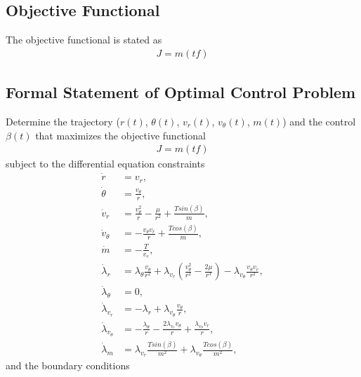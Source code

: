 \documentclass[]{article}
\begin{document}
\subsection{Objective Functional}
The objective functional is stated as
\begin{align}
	J = m(tf)
\end{align}
\subsection{Formal Statement of Optimal Control Problem}
Determine the trajectory (\(r(t)\), \(\theta(t)\), \(v_r(t)\), \(v_\theta(t)\), \(m(t)\)) and the control \(\beta(t)\) that maximizes the objective functional
\begin{align*}
	J = m(tf)
\end{align*}
subject to the differential equation constraints
\begin{align*}
	\dot{r}        &= v_r, \\
	\dot{\theta}   &= \frac{v_\theta}{r}, \\
	\dot{v}_r      &= \frac{v^2_{\theta}}{r} - \frac{\mu}{r^2} + \frac{Tsin(\beta)}{m}, \\
    \dot{v}_\theta &= -\frac{v_{\theta}v_{r}}{r}   + \frac{Tcos(\beta)}{m}, \\
	\dot{m}        &= -\frac{T}{v_e}, \\
	\dot{\lambda}_r      &=\lambda_\theta\frac{v_\theta}{r^2} + \lambda_{v_r}(\frac{v_{\theta}^2}{r^2} - \frac{2\mu}{r^3}) - \lambda_{v_\theta}\frac{v_{\theta}v_r}{r^2},\\
    \dot{\lambda}_\theta &= 0,                                                                                                    \\
    \dot{\lambda}_{v_r}  &= -\lambda_r + \lambda_{v_\theta}\frac{v_\theta}{r},                                                    \\
    \dot{\lambda}_{v_\theta} &= -\frac{\lambda_\theta}{r} - \frac{2\lambda_{v_r}v_\theta}{r} + \frac{\lambda_{v_\theta}v_r}{r}, \\
    \dot{\lambda}_m          &= \lambda_{v_r}\frac{Tsin(\beta)}{m^2} + \lambda_{v_\theta}\frac{Tcos(\beta)}{m^2},                      	
\end{align*}
and the boundary conditions                                                                                                                                                                
\end{document}
